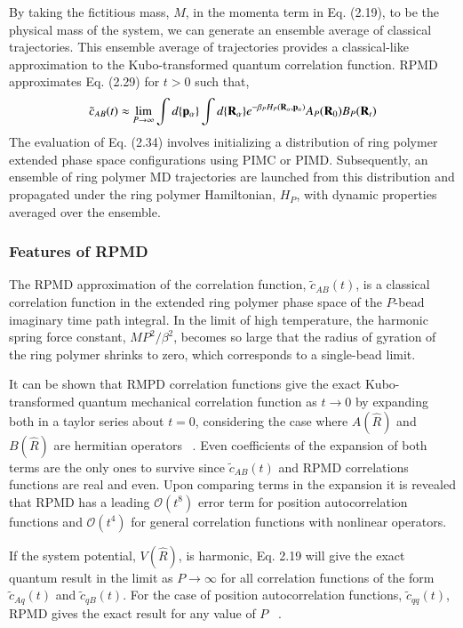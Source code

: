 \documentclass[phd,tocprelim]{cornell}
\begin{document}
By taking the fictitious mass, $M$, in the momenta term in Eq. (2.19),  to be the physical mass of the system, we can generate an ensemble average of classical trajectories. This ensemble average of trajectories provides a classical-like approximation to the Kubo-transformed quantum correlation function.  RPMD approximates Eq. (2.29) for $t>0$ such that, 
\begin{equation}
\tilde{c}_{AB} (t) \approx \lim_{P \to \infty} \int   d\{{\bf{p}}_{\alpha}\}\int   d\{{\bf{R}}_{\alpha}\}  e^{-\beta_P H_P({\bf{R}}_{\alpha}, {\bf{p}}_{\alpha})} A_P({\bf{R}}_{0})B_P({\bf{R}}_{t})
\end{equation}
The evaluation of Eq. (2.34) involves initializing a distribution of ring polymer extended phase space configurations using PIMC or PIMD. Subsequently, an ensemble of ring polymer MD trajectories are launched from this distribution and propagated under the ring polymer Hamiltonian, $H_P$, with dynamic properties averaged over the ensemble.

\subsubsection{Features of RPMD}
The RPMD approximation of the correlation function, $ \tilde{c}_{AB} (t)$, is a classical correlation function in the extended ring polymer phase space of the $P$-bead imaginary time path integral. 
In the limit of high temperature,  the harmonic spring force constant, $MP^2/\beta^2$, becomes so large that the radius of gyration of the ring polymer shrinks to zero, which corresponds to a single-bead limit. 

It can be shown that RMPD correlation functions give the exact Kubo-transformed quantum mechanical correlation function as $t\to0$ by expanding both in a taylor series about $t=0$, considering the case where $A(\hat{R})$ and $B(\hat{R})$ are hermitian operators ~\cite{MANO2006}. Even coefficients of the expansion of both terms are the only ones to survive since $\tilde{c}_{AB}(t)$ and RPMD correlations functions are real and even. Upon comparing terms in the expansion it is revealed that RPMD has a leading $\mathcal{O}(t^8)$ error term for position autocorrelation functions and $\mathcal{O}(t^4)$ for general correlation functions with nonlinear operators. 

If the system potential, $V(\hat{R})$, is harmonic, Eq. 2.19  will give the exact quantum result in the limit as $P\to\infty$ for all correlation functions of the form $\tilde{c}_{Aq}(t)$ and $\tilde{c}_{qB}(t)$. For the case of position autocorrelation functions, $\tilde{c}_{qq}(t)$, RPMD gives the exact result for any value of $P$~ \cite{ICDM2004}.
\end{document}
